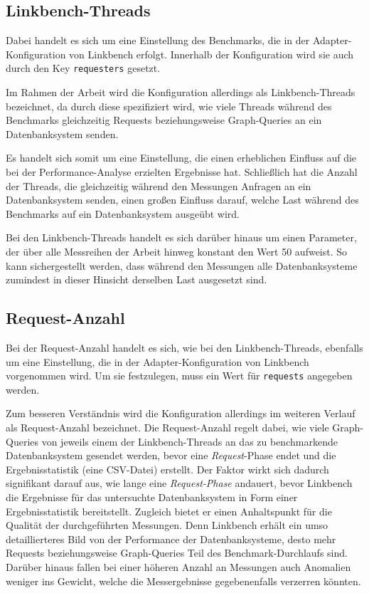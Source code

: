 \subsection{Linkbench-Threads}
\label{analyse:linkbench:threads}
Dabei handelt es sich um eine Einstellung des Benchmarks, die in der Adapter-Konfiguration von Linkbench erfolgt. Innerhalb der Konfiguration wird sie auch durch den Key \texttt{requesters} gesetzt. 

Im Rahmen der Arbeit wird die Konfiguration allerdings als Linkbench-Threads bezeichnet, da durch diese spezifiziert wird, wie viele Threads während des Benchmarks gleichzeitig Requests beziehungsweise Graph-Queries an ein Datenbanksystem senden.

Es handelt sich somit um eine Einstellung, die einen erheblichen Einfluss auf die bei der Performance-Analyse erzielten Ergebnisse hat. Schließlich hat die Anzahl der Threads, die gleichzeitig während den Messungen Anfragen an ein Datenbanksystem senden, einen großen Einfluss darauf, welche Last während des Benchmarks auf ein Datenbanksystem ausgeübt wird. 

Bei den Linkbench-Threads handelt es sich darüber hinaus um einen Parameter, der über alle Messreihen der Arbeit hinweg konstant den Wert 50 aufweist. So kann sichergestellt werden, dass während den Messungen alle Datenbanksysteme zumindest in dieser Hinsicht derselben Last ausgesetzt sind. 

\subsection{Request-Anzahl}
\label{analyse:request_anzahl}
Bei der Request-Anzahl handelt es sich, wie bei den Linkbench-Threads, ebenfalls um eine Einstellung, die in der Adapter-Konfiguration von Linkbench vorgenommen wird. Um sie festzulegen, muss ein Wert für \texttt{requests} angegeben werden. 

Zum besseren Verständnis wird die Konfiguration allerdings im weiteren Verlauf als Request-Anzahl bezeichnet. Die Request-Anzahl regelt dabei, wie viele Graph-Queries von jeweils einem der Linkbench-Threads an das zu benchmarkende Datenbanksystem gesendet werden, bevor eine \textit{Request}-Phase endet und die Ergebnisstatistik (eine CSV-Datei) erstellt. Der Faktor wirkt sich dadurch signifikant darauf aus, wie lange eine \textit{Request-Phase} andauert, bevor Linkbench die Ergebnisse für das untersuchte Datenbanksystem in Form einer Ergebnisstatistik bereitstellt. Zugleich bietet er einen Anhaltspunkt für die Qualität der durchgeführten Messungen. Denn Linkbench erhält ein umso detaillierteres Bild von der Performance der Datenbanksysteme, desto mehr Requests beziehungsweise Graph-Queries Teil des Benchmark-Durchlaufs sind. Darüber hinaus fallen bei einer höheren Anzahl an Messungen auch Anomalien weniger ins Gewicht, welche die Messergebnisse gegebenenfalls verzerren könnten.

